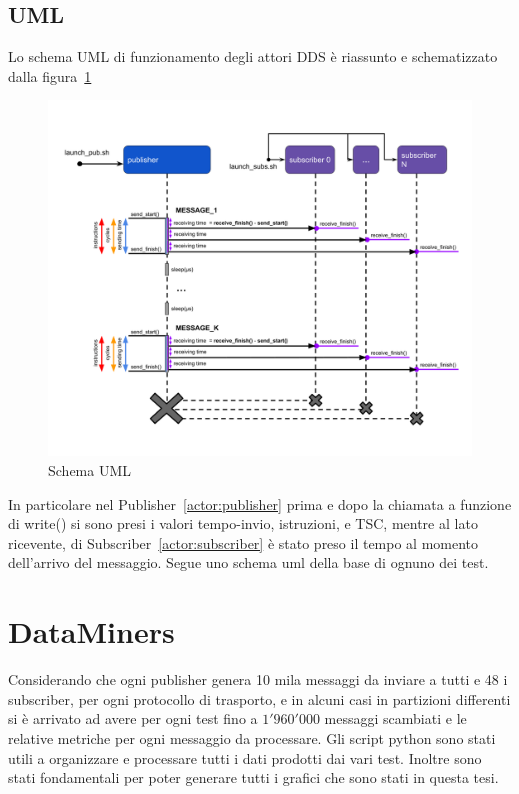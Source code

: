 \subsection{UML}
Lo schema UML di funzionamento degli attori DDS è riassunto e schematizzato dalla figura~\ref{fig:uml}
\begin{figure}[H]
    \centering
    \includegraphics[width=\textwidth]{./img/umel-send-receive.png}
    \caption{Schema UML}\label{fig:uml}
\end{figure}

In particolare nel Publisher~\ref{actor:publisher} prima e dopo la chiamata a funzione di write() %
si sono presi i valori tempo-invio, istruzioni, e TSC, mentre al lato ricevente, di Subscriber~\ref{actor:subscriber} è stato preso il tempo al momento dell'arrivo del messaggio. Segue uno schema uml della base di ognuno dei test.


\section{DataMiners}
Considerando che ogni publisher genera 10 mila messaggi da inviare a tutti e 48 i subscriber, per ogni protocollo di trasporto, e in alcuni casi in partizioni differenti si è arrivato ad avere per ogni test fino a $1'960'000$ messaggi scambiati e le relative metriche per ogni messaggio da processare. 
Gli script python sono stati utili a organizzare e processare tutti i dati prodotti dai vari test. Inoltre sono stati fondamentali per poter generare tutti i grafici che sono stati in questa tesi.

